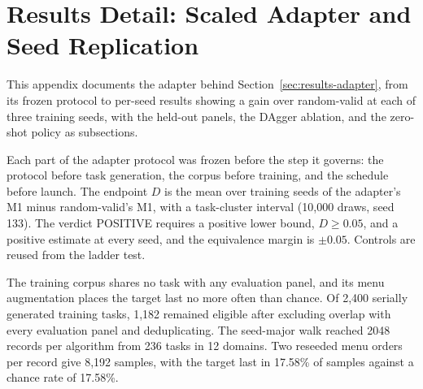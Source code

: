 \section{Results Detail: Scaled Adapter and Seed Replication}
\label{app:results-adapter}

This appendix documents the adapter behind Section~\ref{sec:results-adapter}, from its frozen protocol to per-seed results showing a gain over random-valid at each of three training seeds, with the held-out panels, the DAgger ablation, and the zero-shot policy as subsections.

Each part of the adapter protocol was frozen before the step it governs: the protocol before task generation, the corpus before training, and the schedule before launch. The endpoint $D$ is the mean over training seeds of the adapter's M1 minus random-valid's M1, with a task-cluster interval (10,000 draws, seed 133). The verdict POSITIVE requires a positive lower bound, $D \ge 0.05$, and a positive estimate at every seed, and the equivalence margin is $\pm 0.05$. Controls are reused from the ladder test.

The training corpus shares no task with any evaluation panel, and its menu augmentation places the target last no more often than chance. Of 2,400 serially generated training tasks, 1,182 remained eligible after excluding overlap with every evaluation panel and deduplicating. The seed-major walk reached 2048 records per algorithm from 236 tasks in 12 domains. Two reseeded menu orders per record give 8,192 samples, with the target last in 17.58\% of samples against a chance rate of 17.58\%.

